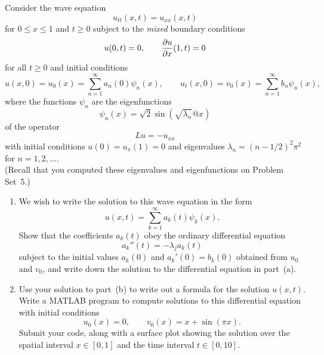 Consider the wave equation
\[ u_{tt}(x,t) = u_{xx}(x,t) \]
for $0\le x\le 1$ and $t\ge 0$ subject to the \emph{mixed} boundary conditions
\[ u(0,t) = 0, \qquad {{\partial}u\over {\partial}x}(1,t) = 0\]
for all $t\ge 0$ and initial conditions
\[  u(x,0) = u_0(x) = \sum_{n=1}^\infty a_n(0) \psi_n(x), \qquad
    u_t(x,0) = v_0(x) = \sum_{n=1}^\infty b_n \psi_n(x),\]
where the functions $\psi_n$ are the eigenfunctions 
\[ \psi_n(x) = \sqrt{2} \sin(\sqrt{\lambda_n}@x)\]
of the operator
   \[ L u = -u_{xx}\]
with initial conditions $u(0) = u_x(1) = 0$  and 
eigenvalues $\lambda_n = (n-1/2)^2 \pi^2$ for $n=1,2,\ldots.$\\
(Recall that you computed these eigenvalues and eigenfunctions on Problem Set~5.)



\begin{enumerate}
\item We wish to write the solution to this wave equation in the form
         \[ u(x,t) = \sum_{k=1}^\infty a_k(t) \psi_k(x).\]
      Show that the coefficients $a_k(t)$ obey the ordinary differential equation 
       \[ a_k''(t) = -\lambda_j a_k(t) \]
      subject to the initial values $a_k(0)$ and $a_k'(0) = b_k(0)$
      obtained from $u_0$ and $v_0$, and write down the solution to the differential equation in part~(a).

\item Use your solution to part~(b) to write out a formula for the solution $u(x,t)$.  Write a MATLAB program to compute solutions to this differential equation 
      with initial conditions
        \[ u_0(x) = 0, \qquad v_0(x) = x+\sin(\pi x).\]
      Submit your code, along with a surface plot showing the solution over 
      the spatial interval $x\in[0,1]$ and the time interval $t\in [0,10]$.
\end{enumerate}


